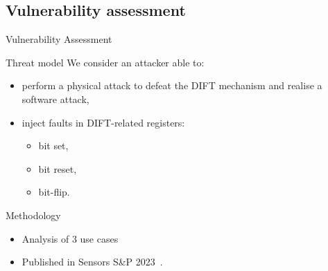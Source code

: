 \subsection{Vulnerability assessment}
\begin{frame}{Vulnerability Assessment}
    \begin{block}{Threat model}
        We consider an attacker able to:
        \begin{itemize}
            \item perform a physical attack to defeat the DIFT mechanism and realise a software attack,
            \item inject faults in DIFT-related registers:
                  \begin{itemize}
                      \item bit set,
                      \item bit reset,
                      \item bit-flip.
                  \end{itemize}
        \end{itemize}
    \end{block}

    \begin{block}{Methodology}
        \begin{itemize}
            \item Analysis of 3 use cases%
            \item Published in Sensors S\&P 2023~\cite{PLG-23-SensorsSP}.
        \end{itemize}
    \end{block}
\end{frame}
